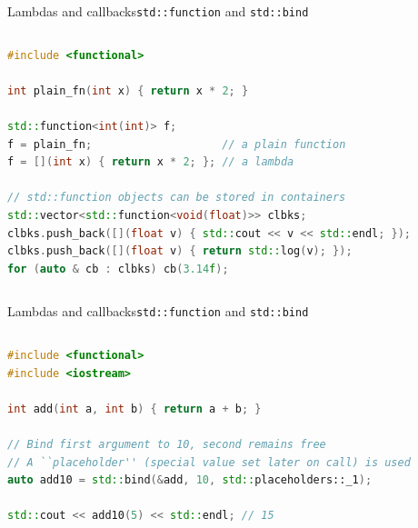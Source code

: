 \begin{frame}[fragile]{Lambdas and callbacks}{\texttt{std::function} and \texttt{std::bind}}
  \begin{columns}
		\begin{lstlisting}[style=codebeamer, language=C++, caption=Storing heterogeneous callables in \texttt{std::function}.]
#include <functional>

int plain_fn(int x) { return x * 2; }

std::function<int(int)> f;
f = plain_fn;                    // a plain function
f = [](int x) { return x * 2; }; // a lambda

// std::function objects can be stored in containers
std::vector<std::function<void(float)>> clbks;
clbks.push_back([](float v) { std::cout << v << std::endl; });
clbks.push_back([](float v) { return std::log(v); });
for (auto & cb : clbks) cb(3.14f);
    \end{lstlisting}
	\end{columns}
\end{frame}
\begin{frame}[fragile]{Lambdas and callbacks}{\texttt{std::function} and \texttt{std::bind}}
	\begin{columns}
		\begin{lstlisting}[style=codebeamer, language=C++, caption=\texttt{std::bind} usage example to bind a function to some of its arguments.]
#include <functional>
#include <iostream>

int add(int a, int b) { return a + b; }

// Bind first argument to 10, second remains free
// A ``placeholder'' (special value set later on call) is used
auto add10 = std::bind(&add, 10, std::placeholders::_1);

std::cout << add10(5) << std::endl; // 15
    \end{lstlisting}
	\end{columns}
\end{frame}
